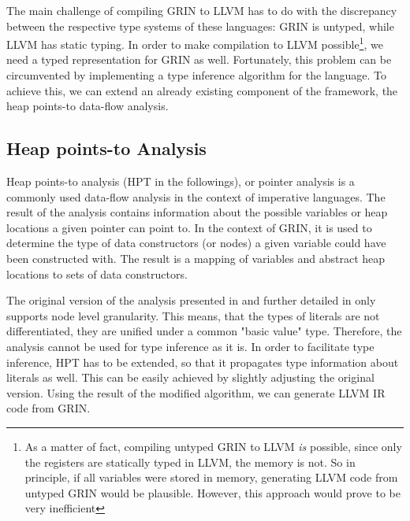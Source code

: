 \documentclass[main.tex]{subfiles}
\begin{document}
	The main challenge of compiling GRIN to LLVM has to do with the discrepancy between the respective type systems of these languages: GRIN is untyped, while LLVM has static typing. In order to make compilation to LLVM possible\footnote{As a matter of fact, compiling untyped GRIN to LLVM \emph{is} possible, since only the registers are statically typed in LLVM, the memory is not. So in principle, if all variables were stored in memory, generating LLVM code from untyped GRIN would be plausible. However, this approach would prove to be very inefficient}, we need a typed representation for GRIN as well. Fortunately, this problem can be circumvented by implementing a type inference algorithm for the language. To achieve this, we can extend an already existing component of the framework, the heap points-to data-flow analysis.
	
	\subsection{Heap points-to Analysis}
	
	Heap points-to analysis (HPT in the followings), or pointer analysis is a commonly used data-flow analysis in the context of imperative languages. The result of the analysis contains information about the possible variables or heap locations a given pointer can point to. In the context of GRIN, it is used to determine the type of data constructors (or nodes) a given variable could have been constructed with. The result is a mapping of variables and abstract heap locations to sets of data constructors.
	
	
	The original version of the analysis presented in \cite{boquist-phd} and further detailed in \cite{boquist-grin} only supports node level granularity. This means, that the types of literals are not differentiated, they are unified under a common "basic value" type. Therefore, the analysis cannot be used for type inference as it is. In order to facilitate type inference, HPT has to be extended, so that it propagates type information about literals as well. This can be easily achieved by slightly adjusting the original version. Using the result of the modified algorithm, we can generate LLVM IR code from GRIN.
	
	
\end{document}
